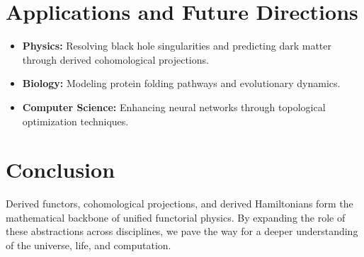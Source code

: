 \documentclass{article}
\begin{document}
\section{Applications and Future Directions}
\begin{itemize}
    \item \textbf{Physics:} Resolving black hole singularities and predicting dark matter through derived cohomological projections.
    \item \textbf{Biology:} Modeling protein folding pathways and evolutionary dynamics.
    \item \textbf{Computer Science:} Enhancing neural networks through topological optimization techniques.
\end{itemize}

\section{Conclusion}
Derived functors, cohomological projections, and derived Hamiltonians form the mathematical backbone of unified functorial physics. By expanding the role of these abstractions across disciplines, we pave the way for a deeper understanding of the universe, life, and computation.
\end{document}
